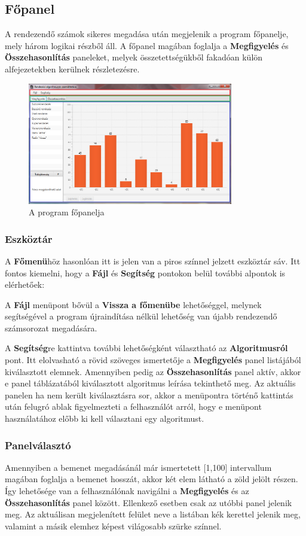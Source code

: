 \documentclass{elteikthesis}
\begin{document}
\subsection{Főpanel}
A rendezendő számok sikeres megadása után megjelenik a program főpanelje, mely három logikai részből áll. A főpanel magában foglalja a \textbf{Megfigyelés} és \textbf{Összehasonlítás} paneleket, melyek összetettségükből fakadóan külön alfejezetekben kerülnek részletezésre.
 \begin{figure}[H]
 	\centering
 	\includegraphics[width=0.8\textwidth]{pics/mainpanel.png}
 	\caption{A program főpanelja}
 \end{figure}
\subsubsection{Eszköztár}
A \textbf{Főmenü}höz hasonlóan itt is jelen van a piros színnel jelzett eszköztár sáv. Itt fontos kiemelni, hogy a \textbf{Fájl} és \textbf{Segítség} pontokon belül további alpontok is elérhetőek:\par
A \textbf{Fájl} menüpont bővül a \textbf{Vissza a főmenübe} lehetőséggel, melynek segítségével a program újraindítása nélkül lehetőség van újabb rendezendő számsorozat megadására.\par
A \textbf{Segítség}re kattintva további lehetőségként választható az \textbf{Algoritmusról} pont. Itt elolvasható a rövid szöveges ismertetője a \textbf{Megfigyelés} panel listájából kiválasztott elemnek. Amennyiben pedig az \textbf{Összehasonlítás} panel aktív, akkor e panel táblázatából kiválasztott algoritmus leírása tekinthető meg. Az aktuális panelen ha nem került kiválasztásra sor, akkor a menüpontra történő kattintás után felugró ablak figyelmezteti a felhasználót arról, hogy e menüpont használatához előbb ki kell választani egy algoritmust.
\subsubsection{Panelválasztó}
Amennyiben a bemenet megadásánál már ismertetett [1,100] intervallum magában foglalja a bemenet hosszát, akkor két elem látható a zöld jelölt részen. Így lehetősége van a felhasználónak navigálni a \textbf{Megfigyelés} és az \textbf{Összehasonlítás} panel között. Ellenkező esetben csak az utóbbi panel jelenik meg. Az aktuálisan megjelenített felület neve a listában kék kerettel jelenik meg, valamint a másik elemhez képest világosabb szürke színnel.
\end{document}
